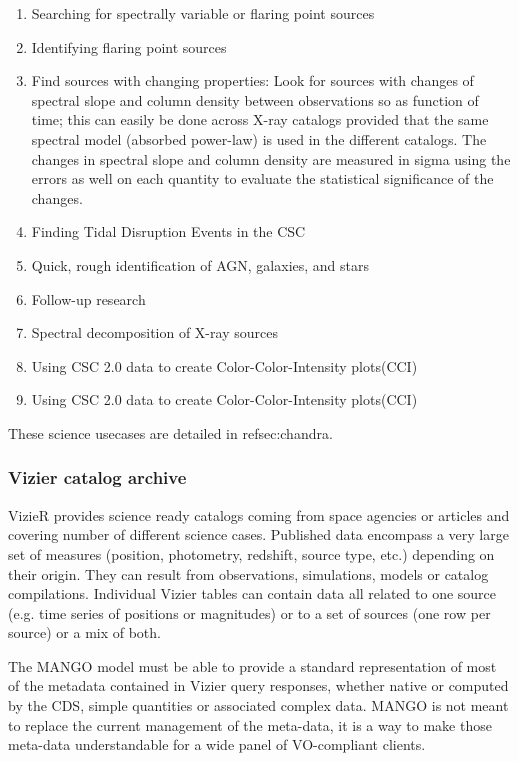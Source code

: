 \documentclass[11pt,a4paper]{ivoa}
\begin{document}
\begin{enumerate}[noitemsep,topsep=0pt,parsep=0pt,partopsep=0pt]
    \item  Searching for spectrally variable or flaring point sources
    \item Identifying flaring point sources
    \item Find sources with changing properties: Look for sources with changes of spectral 
          slope and column density between observations so as function of time;
          this can easily be done across X-ray catalogs provided that the same spectral model (absorbed power-law) 
          is used in the different catalogs. The changes in spectral slope and column density are measured 
          in sigma using the errors as well on each quantity to evaluate the statistical significance of the changes. 
    \item Finding Tidal Disruption Events in the CSC
    \item Quick, rough identification of AGN, galaxies, and stars
    \item Follow-up research
    \item Spectral decomposition of X-ray sources 
    \item Using CSC 2.0 data to create Color-Color-Intensity plots(CCI) \item Using CSC 2.0 data to create Color-Color-Intensity plots(CCI)     

\end{enumerate}

These science usecases are detailed in ref{sec:chandra}.

\subsubsection{Vizier catalog archive}
VizieR provides science ready catalogs coming from space agencies or articles and covering number of
different science cases.
Published data encompass a very large set of measures (position, photometry, redshift, source type, etc.)
depending on their origin.
They can result from  observations, simulations, models or catalog compilations.
Individual Vizier tables can contain data all related to one source (e.g. time series of positions or magnitudes) or to a set of sources (one row per source) or a mix of both.

The MANGO model must be able to provide a standard representation of most of the metadata contained 
in Vizier query responses, whether native or computed  by the CDS,
simple quantities or associated complex data.
MANGO is not meant to replace the current management of the meta-data,
it is a way to make those meta-data understandable for a wide panel of VO-compliant clients.
\end{document}
